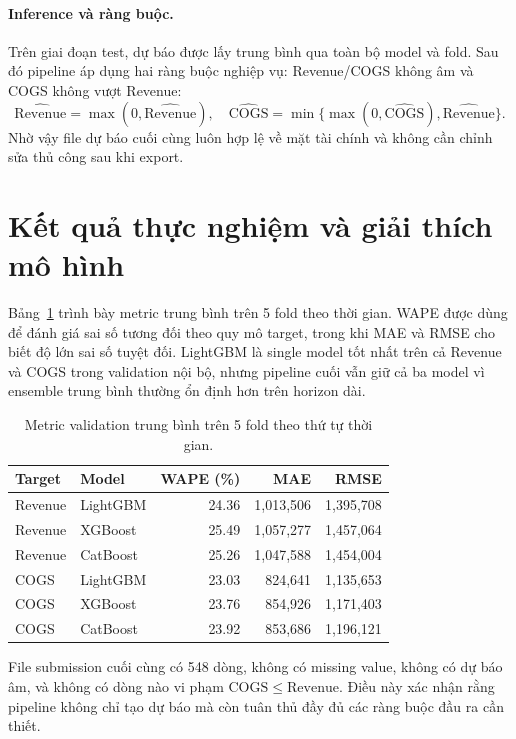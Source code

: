 ﻿\documentclass{article}
\begin{document}
\paragraph{Inference và ràng buộc.}
Trên giai đoạn test, dự báo được lấy trung bình qua toàn bộ model và fold. Sau đó pipeline áp dụng hai ràng buộc nghiệp vụ: Revenue/COGS không âm và COGS không vượt Revenue:
\begin{equation}
\widehat{\mathrm{Revenue}} = \max(0, \widehat{\mathrm{Revenue}}), \quad
\widehat{\mathrm{COGS}} = \min\{\max(0, \widehat{\mathrm{COGS}}), \widehat{\mathrm{Revenue}}\}.
\end{equation}
Nhờ vậy file dự báo cuối cùng luôn hợp lệ về mặt tài chính và không cần chỉnh sửa thủ công sau khi export.

\section{Kết quả thực nghiệm và giải thích mô hình}
Bảng~\ref{tab:cv} trình bày metric trung bình trên 5 fold theo thời gian. WAPE được dùng để đánh giá sai số tương đối theo quy mô target, trong khi MAE và RMSE cho biết độ lớn sai số tuyệt đối. LightGBM là single model tốt nhất trên cả Revenue và COGS trong validation nội bộ, nhưng pipeline cuối vẫn giữ cả ba model vì ensemble trung bình thường ổn định hơn trên horizon dài.

\begin{table}[h]
  \caption{Metric validation trung bình trên 5 fold theo thứ tự thời gian.}
  \label{tab:cv}
  \centering
  \small
  \begin{tabular}{llrrr}
    \toprule
    Target & Model & WAPE (\%) & MAE & RMSE \\
    \midrule
    Revenue & LightGBM & 24.36 & 1,013,506 & 1,395,708 \\
    Revenue & XGBoost & 25.49 & 1,057,277 & 1,457,064 \\
    Revenue & CatBoost & 25.26 & 1,047,588 & 1,454,004 \\
    COGS & LightGBM & 23.03 & 824,641 & 1,135,653 \\
    COGS & XGBoost & 23.76 & 854,926 & 1,171,403 \\
    COGS & CatBoost & 23.92 & 853,686 & 1,196,121 \\
    \bottomrule
  \end{tabular}
\end{table}

File submission cuối cùng có 548 dòng, không có missing value, không có dự báo âm, và không có dòng nào vi phạm \(\mathrm{COGS} \leq \mathrm{Revenue}\). Điều này xác nhận rằng pipeline không chỉ tạo dự báo mà còn tuân thủ đầy đủ các ràng buộc đầu ra cần thiết.
\end{document}
